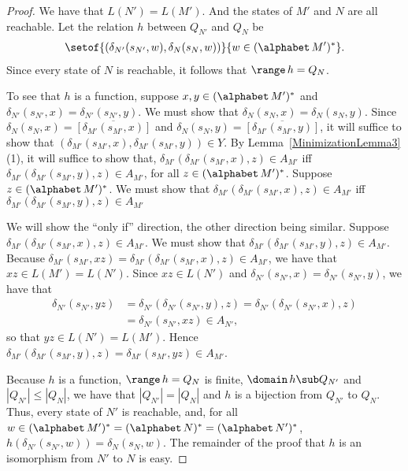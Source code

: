 \begin{proof}
We have that $L(N')=L(M')$.  And the states of $M'$ and $N$ are
all reachable.  Let the relation $h$ between $Q_{N'}$ and $Q_N$ be
\begin{gather*}
  \setof{(\delta_{N'}(s_{N'},w),\delta_N(s_N,w))}{w\in(\alphabet\,M')^*}
  .
\end{gather*}
Since every state of $N$ is reachable, it follows that $\range\,h=
Q_N$.

To see that $h$ is a function, suppose $x,y\in(\alphabet\,M')^*$ and
$\delta_{N'}(s_{N'},x)=\delta_{N'}(s_{N'},y)$.  We must show that
$\delta_N(s_N,x)=\delta_N(s_N,y)$.  Since
$\delta_N(s_N,x)=\overline{[\delta_{M'}(s_{M'},x)]}$ and
$\delta_N(s_N,y)=\overline{[\delta_{M'}(s_{M'},y)]}$, it will suffice
to show that $(\delta_{M'}(s_{M'},x),\delta_{M'}(s_{M'},y))\in Y$.  By
Lemma~\ref{MinimizationLemma3}(1), it will suffice to show that,
$\delta_{M'}(\delta_{M'}(s_{M'},x), z)\in A_{M'}$ iff
$\delta_{M'}(\delta_{M'}(s_{M'},y), z)\in A_{M'}$, for all
$z\in(\alphabet\,M')^*$.  Suppose $z\in(\alphabet\,M')^*$.  We must
show that $\delta_{M'}(\delta_{M'}(s_{M'},x), z)\in A_{M'}$ iff
$\delta_{M'}(\delta_{M'}(s_{M'},y), z)\in A_{M'}$

We will show the ``only if'' direction, the other direction being
similar.  Suppose $\delta_{M'}(\delta_{M'}(s_{M'},x), z)\in A_{M'}$.
We must show that $\delta_{M'}(\delta_{M'}(s_{M'},y), z)\in A_{M'}$.
Because $\delta_{M'}(s_{M'},xz) = \delta_{M'}(\delta_{M'}(s_{M'},x),
z)\in A_{M'}$, we have that $xz\in L(M')=L(N')$.  Since $xz\in L(N')$
and $\delta_{N'}(s_{N'},x)=\delta_{N'}(s_{N'},y)$, we have that
\begin{align*}
  \delta_{N'}(s_{N'},yz) &= \delta_{N'}(\delta_{N'}(s_{N'},y), z) =
  \delta_{N'}(\delta_{N'}(s_{N'},x), z)\\
  &= \delta_{N'}(s_{N'},xz) \in A_{N'} ,
\end{align*}
so that $yz\in L(N')=L(M')$.  Hence
$\delta_{M'}(\delta_{M'}(s_{M'},y), z) = \delta_{M'}(s_{M'},yz) \in
A_{M'}$.

Because $h$ is a function, $\range\,h=Q_N$ is finite, $\domain\,h\sub
Q_{N'}$ and $|Q_{N'}|\leq|Q_N|$, we have that $|Q_{N'}|=|Q_N|$ and $h$
is a bijection from $Q_{N'}$ to $Q_N$.  Thus, every state of $N'$ is
reachable, and, for all $w\in(\alphabet\,M')^* = (\alphabet\,N)^* =
(\alphabet\,N')^*$, $h(\delta_{N'}(s_{N'},w))=\delta_N(s_N,w)$.  The
remainder of the proof that $h$ is an isomorphism from $N'$ to $N$ is
easy.
\end{proof}

